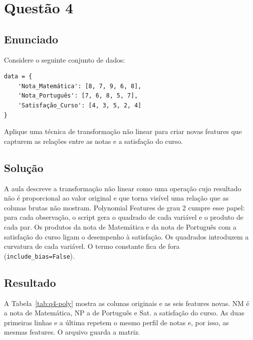 \section{Questão 4}

\subsection{Enunciado}

Considere o seguinte conjunto de dados:
\begin{verbatim}
data = {
    'Nota_Matemática': [8, 7, 9, 6, 8],
    'Nota_Português': [7, 6, 8, 5, 7],
    'Satisfação_Curso': [4, 3, 5, 2, 4]
}
\end{verbatim}
Aplique uma técnica de transformação não linear para criar novas features que capturem as relações entre as notas e a satisfação do curso.

\subsection{Solução}

A aula descreve a transformação não linear como uma operação cujo resultado não é proporcional ao valor original e que torna visível uma relação que as colunas brutas não mostram. Polynomial Features de grau 2 cumpre esse papel: para cada observação, o script gera o quadrado de cada variável e o produto de cada par. Os produtos da nota de Matemática e da nota de Português com a satisfação do curso ligam o desempenho à satisfação. Os quadrados introduzem a curvatura de cada variável. O termo constante fica de fora (\texttt{include\_bias=False}).

\subsection{Resultado}

A Tabela~\ref{tab:q4-poly} mostra as colunas originais e as seis features novas. NM é a nota de Matemática, NP a de Português e Sat. a satisfação do curso. As duas primeiras linhas e a última repetem o mesmo perfil de notas e, por isso, as mesmas features. O arquivo  guarda a matriz.

